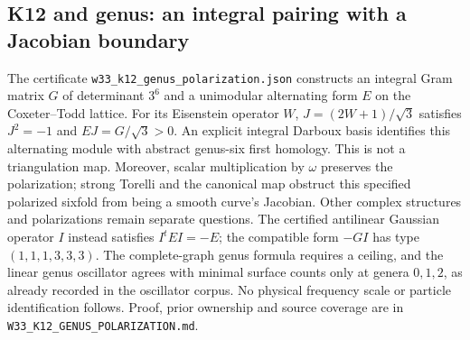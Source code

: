 \subsection{K12 and genus: an integral pairing with a Jacobian boundary}
The certificate \texttt{w33\_k12\_genus\_polarization.json} constructs an
integral Gram matrix $G$ of determinant $3^6$ and a unimodular alternating
form $E$ on the Coxeter--Todd lattice. For its Eisenstein operator $W$,
$J=(2W+1)/\sqrt3$ satisfies $J^2=-1$ and $EJ=G/\sqrt3>0$.
An explicit integral Darboux basis identifies this alternating module with
abstract genus-six first homology. This is not a triangulation map.
Moreover, scalar multiplication by $\omega$ preserves the polarization;
strong Torelli and the canonical map obstruct this specified polarized
sixfold from being a smooth curve's Jacobian. Other complex structures
and polarizations remain separate questions.
The certified antilinear Gaussian operator $I$ instead satisfies
$I^tEI=-E$; the compatible form $-GI$ has type $(1,1,1,3,3,3)$.
The complete-graph genus formula requires a ceiling, and the linear genus
oscillator agrees with minimal surface counts only at genera $0,1,2$,
as already recorded in the oscillator corpus. No physical frequency scale
or particle identification follows. Proof, prior ownership and source
coverage are in \texttt{W33\_K12\_GENUS\_POLARIZATION.md}.
